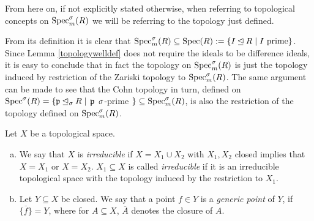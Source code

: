 From here on, if not explicitly stated otherwise, when referring to topological concepts on $\operatorname{Spec}^\sigma_m(R)$ we will be referring to the topology just defined.

\begin{rem}
From its definition it is clear that $\operatorname{Spec}^\sigma_m(R) \subseteq \operatorname{Spec}(R):= \{ I \unlhd R \mid I \text{ prime} \}$. Since Lemma \ref{topologywelldef} does not require the ideals to be difference ideals, 
it is easy to conclude that in fact the topology on $\operatorname{Spec}^\sigma_m(R)$ is just the topology induced by restriction of the Zariski topology to $\operatorname{Spec}^\sigma_m(R)$. The same argument can be made to see that the Cohn topology in turn,
defined on $\operatorname{Spec}^\sigma(R) = \{ \mathfrak{p} \unlhd_{\sigma} R \mid $ $\mathfrak{p}$ $ \sigma$-prime $\} \subseteq \operatorname{Spec}^\sigma_m(R)$, is also the restriction of the topology defined on $\operatorname{Spec}^\sigma_m(R)$. 
\end{rem}

\begin{defn}
Let $X$ be a topological space.
\begin{enumerate}[(a)]
\item  We say that $X$ is \emph{irreducible} if $X = X_1 \cup X_2$ with $X_1, X_2$ closed implies that $X = X_1$ or $X = X_2$. 
$X_1 \subseteq X$ is called \emph{irreducible} if it is an irreducible topological space with the topology induced by the restriction to $X_1$.
\item Let $Y \subseteq X$ be closed. We say that a point $f \in Y$ is a \emph{generic point} of $Y$, if $\overline{\{  f \} } = Y$, where for $A \subseteq X$, $\overline{A}$ denotes the closure of $A$. 
\end{enumerate}
\end{defn}

